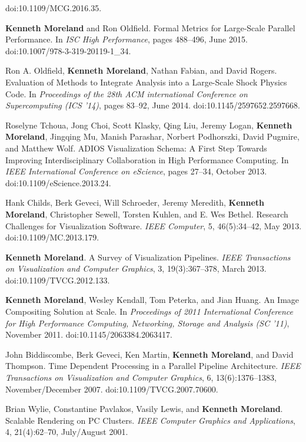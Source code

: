 \begin{enumerate}[label={[\arabic*]}, left=0pt]
  doi:10.1109/MCG.2016.35.
\item  %
  \textbf{Kenneth Moreland} and Ron Oldfield.
  Formal Metrics for Large-Scale Parallel Performance.
  In \emph{ISC High Performance}, pages 488--496, June 2015.
  doi:10.1007/978-3-319-20119-1\_34.
\item  %
  Ron A. Oldfield, \textbf{Kenneth Moreland}, Nathan Fabian, and David Rogers.
  Evaluation of Methods to Integrate Analysis into a Large-Scale Shock Physics Code.
  In \emph{Proceedings of the 28th ACM international Conference on Supercomputing (ICS '14)}, pages 83--92, June 2014.
  doi:10.1145/2597652.2597668.
\item  %
  Roselyne Tchoua, Jong Choi, Scott Klasky, Qing Liu, Jeremy Logan, \textbf{Kenneth Moreland}, Jingqing Mu, Manish Parashar, Norbert Podhorszki, David Pugmire, and Matthew Wolf.
  {ADIOS} Visualization Schema: A First Step Towards Improving Interdisciplinary Collaboration in High Performance Computing.
  In \emph{IEEE International Conference on eScience}, pages 27--34, October 2013.
  doi:10.1109/eScience.2013.24.
\item  %
  Hank Childs, Berk Geveci, Will Schroeder, Jeremy Meredith, \textbf{Kenneth Moreland}, Christopher Sewell, Torsten Kuhlen, and E. Wes Bethel.
  Research Challenges for Visualization Software.
  \emph{IEEE Computer}, 5, 46(5):34--42, May 2013.
  doi:10.1109/MC.2013.179.
\item  %
  \textbf{Kenneth Moreland}.
  A Survey of Visualization Pipelines.
  \emph{IEEE Transactions on Visualization and Computer Graphics}, 3, 19(3):367--378, March 2013.
  doi:10.1109/TVCG.2012.133.
\item  %
  \textbf{Kenneth Moreland}, Wesley Kendall, Tom Peterka, and Jian Huang.
  An Image Compositing Solution at Scale.
  In \emph{Proceedings of 2011 International Conference for High Performance Computing, Networking, Storage and Analysis (SC '11)}, November 2011.
  doi:10.1145/2063384.2063417.
\item  %
  John Biddiscombe, Berk Geveci, Ken Martin, \textbf{Kenneth Moreland}, and David Thompson.
  Time Dependent Processing in a Parallel Pipeline Architecture.
  \emph{IEEE Transactions on Visualization and Computer Graphics}, 6, 13(6):1376--1383, November/December 2007.
  doi:10.1109/TVCG.2007.70600.
\item  %
  Brian Wylie, Constantine Pavlakos, Vasily Lewis, and \textbf{Kenneth Moreland}.
  Scalable Rendering on {PC} Clusters.
  \emph{IEEE Computer Graphics and Applications}, 4, 21(4):62--70, July/August 2001.
\end{enumerate}